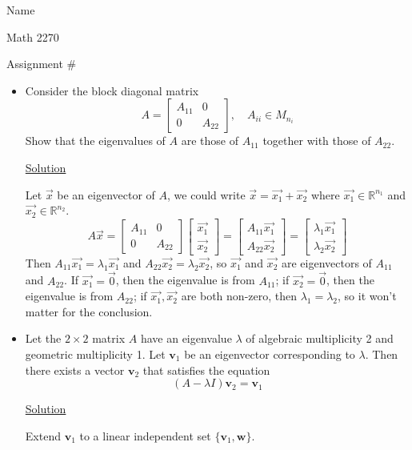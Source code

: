 \documentclass[12pt]{article}
\begin{document}
\hfill Name 

\hfill Math 2270

\hfill Assignment \#


\begin{itemize}

\item [1)] Consider the block diagonal matrix
\[
A=\begin{bmatrix}
    A_{11}&0\\
    0&A_{22}
\end{bmatrix},\quad A_{ii}\in M_{n_i}
\]
Show that the eigenvalues of $A$ are those of $A_{11}$ together with those of $A_{22}$.

\underline{Solution}

Let $\vec{x}$ be an eigenvector of $A$, we could write $\vec{x}=\vec{x_1}+\vec{x_2}$ where $\vec{x_1}\in\mathbb{R}^{n_1}$ and $\vec{x_2}\in\mathbb{R}^{n_2}$.
\[
A\vec{x}=\begin{bmatrix}
    A_{11}&0\\0&A_{22}
\end{bmatrix}\begin{bmatrix}
    \vec{x_1}\\\vec{x_2}
\end{bmatrix}=\begin{bmatrix}
    A_{11}\vec{x_1}\\A_{22}\vec{x_2}
\end{bmatrix}=\begin{bmatrix}
    \lambda_1\vec{x_1}\\\lambda_2\vec{x_2}
\end{bmatrix}
\]
Then $A_{11}\vec{x_1}=\lambda_1\vec{x_1}$ and $A_{22}\vec{x_2}=\lambda_2\vec{x_2}$, so $\vec{x_1}$ and $\vec{x_2}$ are eigenvectors of $A_{11}$ and $A_{22}$.
If $\vec{x_1}=\vec{0}$, then the eigenvalue is from $A_{11}$; if $\vec{x_2}=\vec{0}$, then the eigenvalue is from $A_{22}$; if $\vec{x_1},\vec{x_2}$ are both non-zero, then $\lambda_1=\lambda_2$, so it won't matter for the conclusion.




\item [2)] Let the $2\times 2$ matrix $A$ have an eigenvalue $\lambda$ of algebraic multiplicity 2 and geometric multiplicity 1. Let $\mathbf{v}_1$ be an eigenvector corresponding to $\lambda$. Then there exists a vector $\mathbf{v}_2$ that satisfies the equation
\[
(A-\lambda I)\mathbf{v}_2=\mathbf{v}_1
\]

\underline{Solution}

Extend $\mathbf{v}_1$ to a linear independent set $\{\mathbf{v}_1,\mathbf{w}\}$. 


\end{itemize}
\end{document}
